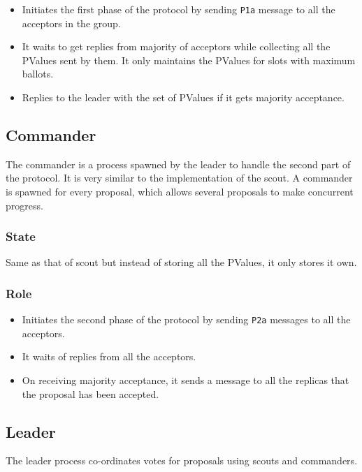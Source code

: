 \begin{itemize}
  \item Initiates the first phase of the protocol by sending \texttt{P1a}
    message to all the acceptors in the group.
  \item It waits to get replies from majority of acceptors while collecting
    all the PValues sent by them. It only maintains the PValues for slots
    with maximum ballots.
  \item Replies to the leader with the set of PValues if it gets majority
    acceptance.
\end{itemize}

\subsection{Commander}

The commander is a process spawned by the leader to handle the second part of
the protocol. It is very similar to the implementation of the scout. A commander
is spawned for every proposal, which allows several proposals to make concurrent
progress.

\subsubsection{State}

Same as that of scout  but instead of storing all the
PValues, it only stores it own.

\subsubsection{Role}

\begin{itemize}
  \item Initiates the second phase of the protocol by sending \texttt{P2a}
    messages to all the acceptors.
  \item It waits of replies from all the acceptors.
  \item On receiving majority acceptance, it sends a message to all the replicas
    that the proposal has been accepted.
\end{itemize}

\subsection{Leader}

The leader process co-ordinates votes for proposals using scouts and commanders.

